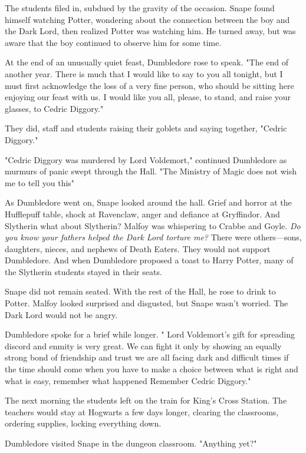 The students filed in, subdued by the gravity of the occasion. Snape found himself watching Potter, wondering about the connection between the boy and the Dark Lord, then realized Potter was watching him. He turned away, but was aware that the boy continued to observe him for some time.

At the end of an unusually quiet feast, Dumbledore rose to speak. "The end of another year. There is much that I would like to say to you all tonight, but I must first acknowledge the loss of a very fine person, who should be sitting here enjoying our feast with us. I would like you all, please, to stand, and raise your glasses, to Cedric Diggory."

They did, staff and students raising their goblets and saying together, "Cedric Diggory."

"Cedric Diggory was murdered by Lord Voldemort," continued Dumbledore as murmurs of panic swept through the Hall. "The Ministry of Magic does not wish me to tell you this{\el}"

As Dumbledore went on, Snape looked around the hall. Grief and horror at the Hufflepuff table, shock at Ravenclaw, anger and defiance at Gryffindor. And Slytherin{\el} what about Slytherin? Malfoy was whispering to Crabbe and Goyle. \emph{Do you know your fathers helped the Dark Lord torture me?} There were others—sons, daughters, nieces, and nephews of Death Eaters. They would not support Dumbledore. And when Dumbledore proposed a toast to Harry Potter, many of the Slytherin students stayed in their seats.

Snape did not remain seated. With the rest of the Hall, he rose to drink to Potter. Malfoy looked surprised and disgusted, but Snape wasn't worried. The Dark Lord would not be angry.

Dumbledore spoke for a brief while longer. "{\el} Lord Voldemort's gift for spreading discord and enmity is very great. We can fight it only by showing an equally strong bond of friendship and trust{\el} we are all facing dark and difficult times{\el} if the time should come when you have to make a choice between what is right and what is easy, remember what happened{\el} Remember Cedric Diggory."

The next morning the students left on the train for King's Cross Station. The teachers would stay at Hogwarts a few days longer, clearing the classrooms, ordering supplies, locking everything down.

Dumbledore visited Snape in the dungeon classroom. "Anything yet?"

